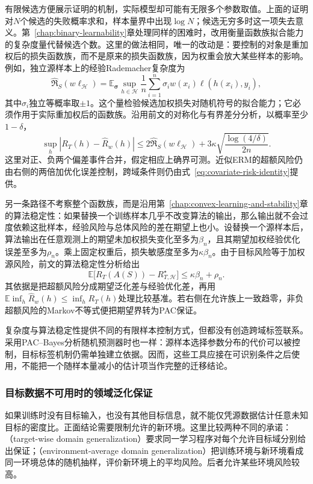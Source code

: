 有限候选方便展示证明的机制，实际模型却可能有无限多个参数取值。上面的证明对$N$个候选的失败概率求和，样本量界中出现$\log N$；候选无穷多时这一项失去意义。第~\ref{chap:binary-learnability}章处理同样的困难时，改用衡量函数族拟合能力的复杂度量代替候选个数。这里的做法相同，唯一的改动是：要控制的对象是重加权后的损失函数族，而不是原来的损失函数族，因为权重会放大某些样本的影响。例如，独立源样本上的经验Rademacher复杂度为
\[
 \widehat{\mathfrak R}_S(w\ell_{\mathcal H})
 =\mathbb E_{\bm\sigma}\sup_{h\in\mathcal H}
 \frac1n\sum_{i=1}^n\sigma_i w(x_i)\ell(h(x_i),y_i),
\]
其中$\sigma_i$独立等概率取$\pm1$。这个量检验候选加权损失对随机符号的拟合能力；它必须作用于实际重加权后的函数族。沿用前文的对称化与有界差分分析，以概率至少$1-\delta$，
\[
 \sup_h|R_T(h)-\widehat R_w(h)|
 \leq2\widehat{\mathfrak R}_S(w\ell_{\mathcal H})
      +3\kappa\sqrt{\frac{\log(4/\delta)}{2n}}.
\]
这里对正、负两个偏差事件合并，假定相应上确界可测。近似ERM的超额风险仍由右侧的两倍加优化误差控制，跨域条件则仍由式~\eqref{eq:covariate-risk-identity}提供。

另一条路径不考察整个函数族，而是沿用第~\ref{chap:convex-learning-and-stability}章的算法稳定性：如果替换一个训练样本几乎不改变算法的输出，那么输出就不会过度依赖这批样本，经验风险与总体风险的差在期望上也小。设替换一个源样本后，算法输出在任意观测上的期望未加权损失变化至多为$\beta_n$，且其期望加权经验优化误差至多为$\rho_n$。乘上固定权重后，损失敏感度至多为$\kappa\beta_n$。由于目标风险等于加权源风险，前文的算法稳定性分析给出
\begin{equation}
 \mathbb E\big[R_T(A(S))-R_{T,\mathcal H}^{\star}\big]
 \leq\kappa\beta_n+\rho_n.
 \label{eq:transfer-stability-excess}
\end{equation}
其依据是把超额风险分成期望泛化差与经验优化差，再用
$\mathbb E\inf_h\widehat R_w(h)\leq\inf_hR_T(h)$处理比较基准。若右侧在允许族上一致趋零，非负超额风险的Markov不等式便把期望界转为PAC保证。

复杂度与算法稳定性提供不同的有限样本控制方式，但都没有创造跨域标签联系。采用PAC--Bayes分析随机预测器时也一样：源样本选择参数分布的代价可以被控制，目标标签机制仍需单独建立依据。因而，这些工具应接在可识别条件之后使用，不能把一个随样本量减小的估计项当作完整的迁移结论。

\subsubsection{目标数据不可用时的领域泛化保证}
\label{sec:domain-generalization}

如果训练时没有目标输入，也没有其他目标信息，就不能仅凭源数据估计任意未知目标的密度比。正面结论需要限制允许的新环境。这里比较两种不同的承诺：（target-wise domain generalization）要求同一学习程序对每个允许目标域分别给出保证；（environment-average domain generalization）把训练环境与新环境看成同一环境总体的随机抽样，评价新环境上的平均风险。后者允许某些环境风险较高。

